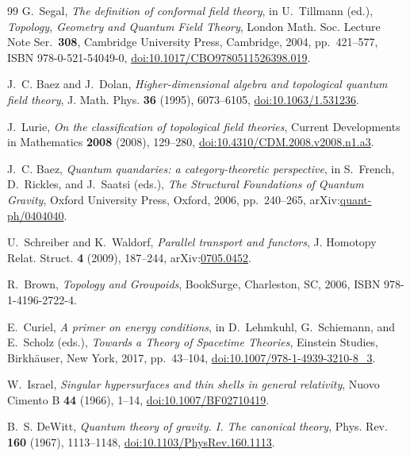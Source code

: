\documentclass[11pt,a4paper,reqno]{amsart}
\theoremstyle{definition}
\numberwithin{equation}{section}
\begin{document}
\begin{thebibliography}{99}
G.~Segal,
\emph{The definition of conformal field theory},
in U.~Tillmann (ed.), \emph{Topology, Geometry and Quantum Field Theory}, London Math. Soc. Lecture Note Ser.~\textbf{308}, Cambridge University Press, Cambridge, 2004, pp.~421--577, ISBN 978-0-521-54049-0,
\href{https://doi.org/10.1017/CBO9780511526398.019}{doi:10.1017/CBO9780511526398.019}.

J.~C. Baez and J.~Dolan,
\emph{Higher-dimensional algebra and topological quantum field theory},
J. Math. Phys. \textbf{36} (1995), 6073--6105,
\href{https://doi.org/10.1063/1.531236}{doi:10.1063/1.531236}.

J.~Lurie,
\emph{On the classification of topological field theories},
Current Developments in Mathematics \textbf{2008} (2008), 129--280,
\href{https://doi.org/10.4310/CDM.2008.v2008.n1.a3}{doi:10.4310/CDM.2008.v2008.n1.a3}.

J.~C. Baez,
\emph{Quantum quandaries: a category-theoretic perspective},
in S.~French, D.~Rickles, and J.~Saatsi (eds.), \emph{The Structural Foundations of Quantum Gravity}, Oxford University Press, Oxford, 2006, pp.~240--265,
arXiv:\href{https://arxiv.org/abs/quant-ph/0404040}{quant-ph/0404040}.

U.~Schreiber and K.~Waldorf,
\emph{Parallel transport and functors},
J. Homotopy Relat. Struct. \textbf{4} (2009), 187--244,
arXiv:\href{https://arxiv.org/abs/0705.0452}{0705.0452}.

R.~Brown,
\emph{Topology and Groupoids},
BookSurge, Charleston, SC, 2006, ISBN 978-1-4196-2722-4.

E.~Curiel,
\emph{A primer on energy conditions},
in D.~Lehmkuhl, G.~Schiemann, and E.~Scholz (eds.), \emph{Towards a Theory of Spacetime Theories}, Einstein Studies, Birkh\"auser, New York, 2017, pp.~43--104,
\href{https://doi.org/10.1007/978-1-4939-3210-8_3}{doi:10.1007/978-1-4939-3210-8\_3}.

W.~Israel,
\emph{Singular hypersurfaces and thin shells in general relativity},
Nuovo Cimento B \textbf{44} (1966), 1--14,
\href{https://doi.org/10.1007/BF02710419}{doi:10.1007/BF02710419}.

B.~S. DeWitt,
\emph{Quantum theory of gravity. I. The canonical theory},
Phys. Rev. \textbf{160} (1967), 1113--1148,
\href{https://doi.org/10.1103/PhysRev.160.1113}{doi:10.1103/PhysRev.160.1113}.


\end{thebibliography}
\end{document}
